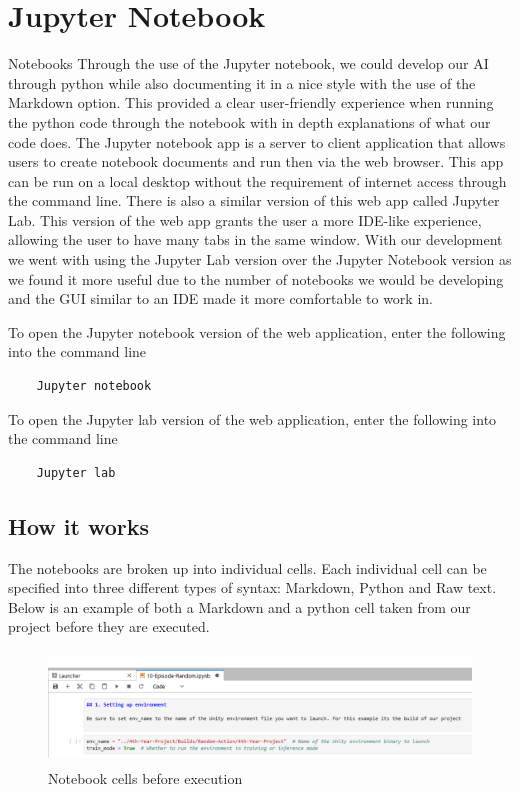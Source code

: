 \section{Jupyter Notebook}
Notebooks
Through the use of the Jupyter notebook, we could develop our AI through python while also documenting it in a nice style with the use of the Markdown option. This provided a clear user-friendly experience when running the python code through the notebook with in depth explanations of what our code does. The Jupyter notebook app is a server to client application that allows users to create notebook documents and run then via the web browser. This app can be run on a local desktop without the requirement of internet access through the command line. There is also a similar version of this web app called Jupyter Lab. This version of the web app grants the user a more IDE-like experience, allowing the user to have many tabs in the same window. With our development we went with using the Jupyter Lab version over the Jupyter Notebook version as we found it more useful due to the number of notebooks we would be developing and the GUI similar to an IDE made it more comfortable to work in. 

To open the Jupyter notebook version of the web application, enter the following into the command line
\begin{verbatim}	
	Jupyter notebook 
\end{verbatim}
To open the Jupyter lab version of the web application, enter the following into the command line
\begin{verbatim}
	Jupyter lab 
\end{verbatim}

\subsection{How it works}
The notebooks are broken up into individual cells. Each individual cell can be specified into three different types of syntax: Markdown, Python and Raw text. Below is an example of both a Markdown and a python cell taken from our project before they are executed.

\begin{figure}[H]
    \centering
    \includegraphics[width=115mm, height=30mm]{img/Notebook1.PNG}
    \caption{Notebook cells before execution}
    \label{fig:sd4}
\end{figure}

